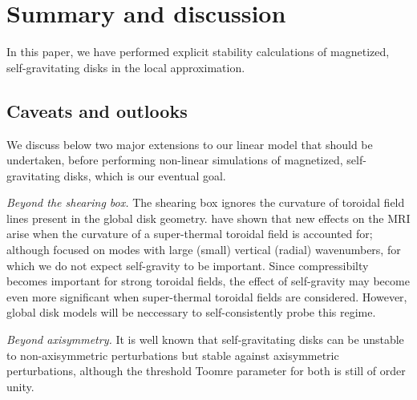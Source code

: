 \section{Summary and discussion}\label{summary}
In this paper, we have performed explicit stability calculations of
magnetized, self-gravitating disks in the local approximation. 






\subsection{Caveats and outlooks}
We discuss below two major extensions to our linear model that
should be undertaken, before performing non-linear simulations of
magnetized, self-gravitating disks, which is our eventual goal.  

\emph{Beyond the shearing box.} The shearing box ignores the curvature
of toroidal field lines present in the global disk
geometry. \cite{pessah05} have shown that new effects on the MRI arise
when the curvature of a super-thermal toroidal field is accounted for;
although \citeauthor{pessah05} focused on modes with large (small)
vertical (radial) wavenumbers, for which we do not expect self-gravity
to be important. Since compressibilty becomes important for strong
toroidal fields, the effect of self-gravity may become even more
significant when super-thermal toroidal fields are
considered. However, global disk models will be neccessary
to self-consistently probe this regime. 

%




\emph{Beyond axisymmetry.} It is well known that self-gravitating
disks can be unstable to non-axisymmetric perturbations but stable
against axisymmetric perturbations, although the threshold Toomre
parameter for both is still of order unity. %
 


